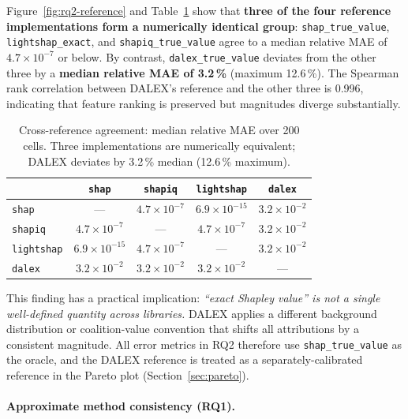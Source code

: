 Figure~\ref{fig:rq2-reference} and Table~\ref{tab:reference} show that
\textbf{three of the four reference implementations form a numerically
identical group}: \texttt{shap\_true\_value}, \texttt{lightshap\_exact},
and \texttt{shapiq\_true\_value} agree to a median relative MAE of
$4.7{\times}10^{-7}$ or below.
By contrast, \texttt{dalex\_true\_value} deviates from the other three by
a \textbf{median relative MAE of 3.2\,\%} (maximum 12.6\,\%).
The Spearman rank correlation between DALEX's reference and the other three
is 0.996, indicating that feature ranking is preserved but magnitudes
diverge substantially.

\begin{table}[ht]
  \centering
  \caption{%
    Cross-reference agreement: median relative MAE over 200 cells.
    Three implementations are numerically equivalent; DALEX deviates by
    3.2\,\% median (12.6\,\% maximum).
  }
  \label{tab:reference}
  \begin{tabular}{lcccc}
    \toprule
    & \texttt{shap} & \texttt{shapiq} & \texttt{lightshap} & \texttt{dalex} \\
    \midrule
    \texttt{shap}      & ---             & $4.7{\times}10^{-7}$ & $6.9{\times}10^{-15}$ & $3.2{\times}10^{-2}$ \\
    \texttt{shapiq}    & $4.7{\times}10^{-7}$  & ---        & $4.7{\times}10^{-7}$ & $3.2{\times}10^{-2}$ \\
    \texttt{lightshap} & $6.9{\times}10^{-15}$ & $4.7{\times}10^{-7}$ & --- & $3.2{\times}10^{-2}$ \\
    \texttt{dalex}     & $3.2{\times}10^{-2}$  & $3.2{\times}10^{-2}$ & $3.2{\times}10^{-2}$ & --- \\
    \bottomrule
  \end{tabular}
\end{table}

This finding has a practical implication: \emph{``exact Shapley value'' is
not a single well-defined quantity across libraries.}
DALEX applies a different background distribution or coalition-value
convention that shifts all attributions by a consistent magnitude.
All error metrics in RQ2 therefore use \texttt{shap\_true\_value} as the
oracle, and the DALEX reference is treated as a separately-calibrated
reference in the Pareto plot (Section~\ref{sec:pareto}).

\paragraph{Approximate method consistency (RQ1).}

